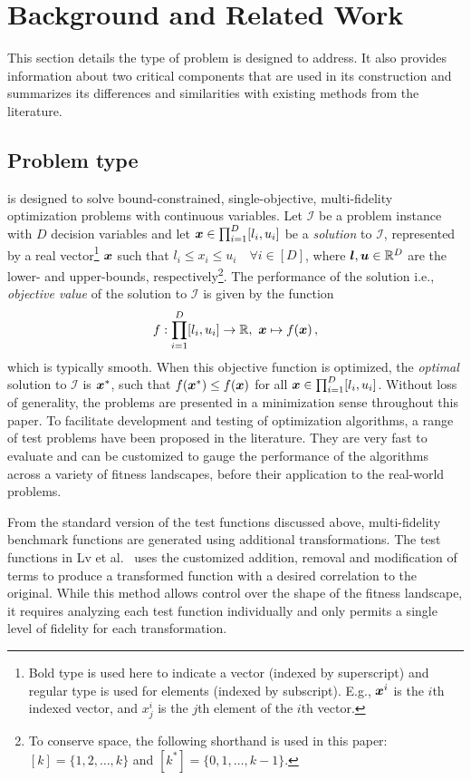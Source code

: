 \section{Background and Related Work}\label{sec:back}
This section details the type of problem \AlgName{} is designed to address. It also provides information about two critical components that are used in its construction and summarizes its differences and similarities with existing methods from the literature.

\subsection{Problem type}
\AlgName{} is designed to solve bound-constrained, single-objective, multi-fidelity optimization problems with continuous variables. Let $\mathcal{I}$ be a problem instance with $D$ decision variables and let $\boldsymbol{x} \in \prod^D_{i=1}[l_i,u_i]$ be a \emph{solution} to $\mathcal{I}$, represented by a real vector\footnote{Bold type is used here to indicate a vector (indexed by superscript) and regular type is used for elements (indexed by subscript). E.g., $\boldsymbol{x}^i$ is the $i$th indexed vector, and $x_j^i$ is the $j$th element of the $i$th vector.} $\boldsymbol{x}$ such that $l_i \le x_i \le u_i \quad \forall {i \in [D]}$, where $\boldsymbol{l},\boldsymbol{u} \in \mathbb{R}^D$ are the lower- and upper-bounds, respectively\footnote{To conserve space, the following shorthand is used in this paper: ${[k] = \{1,2,\dots,k\}}$ and $[k^*] = \{0,1,\dots,k-1\}$.}. The performance of the solution i.e., \emph{objective value} of the solution to $\mathcal{I}$ is given by the function
\begin{equation}
f:\displaystyle\prod^D_{i=1}[l_i,u_i]\to \mathbb{R},\ \boldsymbol{x} \mapsto f(\boldsymbol{x})\,, \label{eq:objective}
\end{equation}
which is typically smooth. When this objective function is optimized, the \emph{optimal} solution to $\mathcal{I}$ is $\boldsymbol{x}^*$, such that $f(\boldsymbol{x}^*) \leq f(\boldsymbol{x})$ for all $\boldsymbol{x} \in \prod^D_{i=1}[l_i,u_i]$. Without loss of generality, the problems are presented in a minimization sense throughout this paper. 
To facilitate development and testing of optimization algorithms, a range of test problems have been proposed in the literature. They are very fast to evaluate and can be customized to gauge the performance of the algorithms across a variety of fitness landscapes, before their application to the real-world problems.

From the standard version of the test functions discussed above, multi-fidelity benchmark functions are generated using additional transformations. The test functions in Lv et al.~\cite{lv2021multi} uses the customized addition, removal and modification of terms to produce a transformed function with a desired correlation to the original. While this method allows control over the shape of the fitness landscape, it requires analyzing each test function individually and only permits a single level of fidelity for each transformation.

